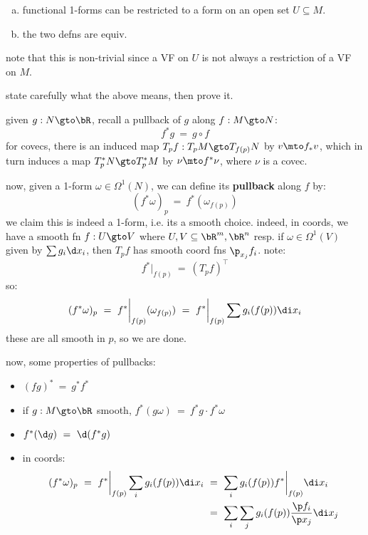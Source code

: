 \begin{prop}\vspace{-0.2in}
	\begin{enumerate}[a)]
		\item functional 1-forms can be restricted to a form on an open
			set $U\subseteq M$.
		\item the two defns are equiv.
	\end{enumerate}
\end{prop}
note that this is non-trivial since a VF on $U$ is not always a restriction of
a VF on $M$.
\begin{exr}
	state carefully what the above means, then prove it.
\end{exr}

given $g:N\gto\bR$, recall a pullback of $g$ along $f:M\gto N$:
\begin{equation*}
	f^{*}g \ = \ g\circ f
\end{equation*}
for covecs, there is an induced map $T_{p}f:T_{p}M\gto T_{f(p)}N$ by
$v\mto f_{*}v$, which in turn induces a map $T_{p}^{*}N\gto T_{p}^{*}M$ by
$\nu\mto f^{*}\nu$, where $\nu$ is a covec.

now, given a 1-form $\omega\in\Omega^{1}(N)$, we can define its \textbf{pullback} along $f$ by:
\begin{equation*}
	(f^{*}\omega)_{p} \ = \ f^{*}(\omega_{f(p)})
\end{equation*}
we claim this is indeed a 1-form, i.e. its a smooth choice.
indeed, in coords, we have a smooth fn $f:U\gto V$ where
$U,V\subseteq\bR^{m},\bR^{n}$ resp.
if $\omega\in\Omega^{1}(V)$ given by $\sum g_{i}\d x_{i}$, then $T_{p}f$ has smooth
coord fns $\p_{x_{j}}f_{i}$. note:
\begin{equation*}
	f^{*}\big\rvert_{f(p)} \ = \ (T_{p}f)^{\intercal}
\end{equation*}
so:
\begin{equation*}
	(f^{*}\omega)_{p} \ = \ f^{*}\bigg\rvert_{f(p)}(\omega_{f(p)})
	\ = \ f^{*}\bigg\rvert_{f(p)}\sum g_{i}(f(p))\di x_{i}
\end{equation*}
these are all smooth in $p$, so we are done.

now, some properties of pullbacks:
\begin{itemize}
	\item $(fg)^{*} \ = \ g^{*}f^{*}$
	\item if $g:M\gto\bR$ smooth, $f^{*}(g\omega) \ = \ f^{*}g \cdot f^{*}\omega$
	\item $f^{*}(\d g) \ = \ \d(f^{*}g)$
	\item in coords:
		\begin{align*}
			(f^{*}\omega)_{p} \ = \ f^{*}\bigg\rvert_{f(p)}\sum_{i}g_{i}(f(p))\di x_{i}
			& \ = \ \sum_{i}g_{i}(f(p))f^{*}\bigg\rvert_{f(p)}\di x_{i} \\
			& \ = \ \sum_{i}\sum_{j}g_{i}(f(p))\frac{\p f_{i}}{\p x_{j}}\di x_{j}
		\end{align*}
\end{itemize}

